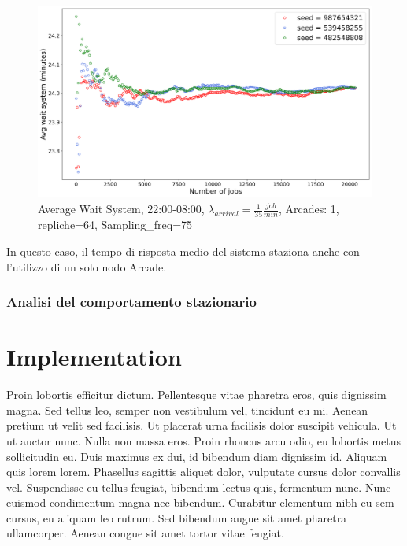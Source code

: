 \documentclass{article}
\begin{document}
\begin{figure}[H]
\centering
\captionsetup{justification=centering,margin=2cm}
\includegraphics[scale=0.48]{images/transient_night_s.png}
\caption{Average Wait System, 22:00-08:00, $\lambda_{arrival}=\frac{1}{35} \frac{job}{min}$, Arcades: 1, repliche=64, Sampling\_freq=75}\label{figura:avg_ws_night_s}
\end{figure}

In questo caso, il tempo di risposta medio del sistema staziona anche con l'utilizzo di un solo nodo Arcade.

\subsubsection{Analisi del comportamento stazionario}

\section{Implementation}

Proin lobortis efficitur dictum. Pellentesque vitae pharetra eros, quis dignissim magna. Sed tellus leo, semper non vestibulum vel, tincidunt eu mi. Aenean pretium ut velit sed facilisis. Ut placerat urna facilisis dolor suscipit vehicula. Ut ut auctor nunc. Nulla non massa eros. Proin rhoncus arcu odio, eu lobortis metus sollicitudin eu. Duis maximus ex dui, id bibendum diam dignissim id. Aliquam quis lorem lorem. Phasellus sagittis aliquet dolor, vulputate cursus dolor convallis vel. Suspendisse eu tellus feugiat, bibendum lectus quis, fermentum nunc. Nunc euismod condimentum magna nec bibendum. Curabitur elementum nibh eu sem cursus, eu aliquam leo rutrum. Sed bibendum augue sit amet pharetra ullamcorper. Aenean congue sit amet tortor vitae feugiat.
\end{document}
